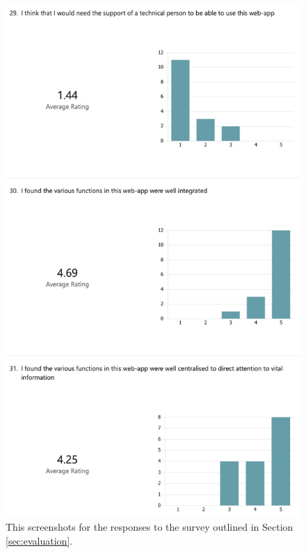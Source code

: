 \documentclass{l4proj}
\begin{document}
\begin{appendices}
\begin{figure}[H]
    \centering
    \includegraphics[width=0.75\linewidth]{dissertation/images/eval-8.jpeg}    
    \caption{This screenshots for the responses to the survey outlined in Section \ref{sec:evaluation}.}
    \label{fig:eval-survey-8} 
\end{figure}


\end{appendices}
\end{document}
